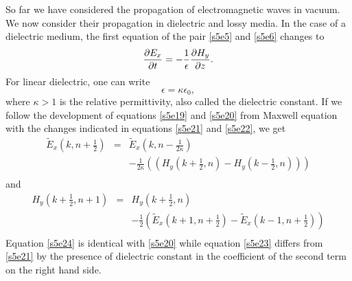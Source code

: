 \documentclass[11pt]{article}
\numberwithin{equation}{section}
\begin{document}
So far we have considered the propagation of electromagnetic waves in 
vacuum. We now consider their propagation in dielectric and lossy media. In
the case of a dielectric medium, the first equation of the pair \eqref{s5e5}
and \eqref{s5e6} changes to
\begin{equation}\label{s5e21}
\pdv{E_x}{t} = -\frac{1}{\epsilon}\pdv{H_y}{z}.
\end{equation}
For linear dielectric, one can write
\begin{equation}\label{s5e22}
\epsilon = \kappa\epsilon_0,
\end{equation}
where $\kappa > 1$ is the relative permittivity, also called the dielectric
constant. If we follow the development of equations \eqref{s5e19} and
\eqref{s5e20} from Maxwell equation with the changes indicated in equations
\eqref{s5e21} and \eqref{s5e22}, we get
\begin{eqnarray}
\tilde{E}_x\left(k ,n+\frac{1}{2}\right) &=& \tilde{E}_x\left(k ,
n-\frac{1}{2\kappa}\right) \nonumber \\
 & & -\frac{1}{2\kappa}\left(\left(
H_y\left(k + \frac{1}{2}, n\right) - H_y\left(k - \frac{1}{2}, n\right)\right)
\right) \nonumber \\
 & & \label{s5e23}
\end{eqnarray}
and
\begin{eqnarray}
H_y\left(k+\frac{1}{2},n+1\right) &=& H_y\left(k+\frac{1}{2}, n\right) 
\nonumber \\
 & & -\frac{1}{2}\left(
\tilde{E}_x\left(k + 1, n + \frac{1}{2}\right) - \tilde{E}_x\left(k - 1, n+\frac{1}{2}\right)
\right) \nonumber \\
 & & \label{s5e24}
\end{eqnarray}
Equation \eqref{s5e24} is identical with \eqref{s5e20} while equation
\eqref{s5e23} differs from \eqref{s5e21} by the presence of dielectric 
constant in the coefficient of the second term on the right hand side.
\end{document}

